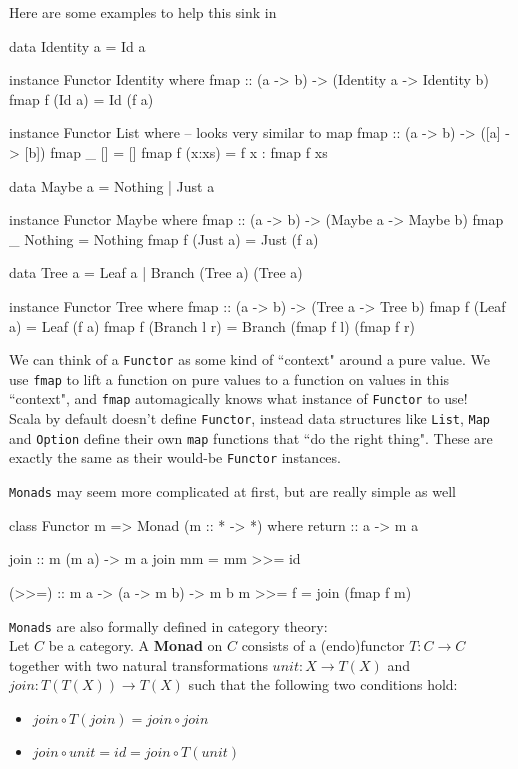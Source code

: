 \documentclass[12pt]{article}
\begin{document}
Here are some examples to help this sink in
\begin{haskell}
data Identity a = Id a

instance Functor Identity where
    fmap :: (a -> b) -> (Identity a -> Identity b)
    fmap f (Id a) = Id (f a)

instance Functor List where
    -- looks very similar to map
    fmap :: (a -> b) -> ([a] -> [b])
    fmap _ []     = []
    fmap f (x:xs) = f x : fmap f xs

data Maybe a = Nothing | Just a

instance Functor Maybe where
    fmap :: (a -> b) -> (Maybe a -> Maybe b)
    fmap _ Nothing  = Nothing
    fmap f (Just a) = Just (f a)

data Tree a = Leaf a | Branch (Tree a) (Tree a)

instance Functor Tree where
    fmap :: (a -> b) -> (Tree a -> Tree b)
    fmap f (Leaf a)     = Leaf (f a)
    fmap f (Branch l r) = Branch (fmap f l) (fmap f r)
\end{haskell}

We can think of a \texttt{Functor} as some kind of ``context" around a pure
value.  We use \texttt{fmap} to lift a function on pure values to a function on
values in this ``context", and \texttt{fmap} automagically knows what instance
of \texttt{Functor} to use! \\

Scala by default doesn't define \texttt{Functor}, instead data structures like
\texttt{List}, \texttt{Map} and \texttt{Option} define their own \texttt{map}
functions that ``do the right thing". These are exactly the same as their
would-be \texttt{Functor} instances.
\newpage

\texttt{Monads} may seem more complicated at first, but are really simple as well
\begin{haskell}
class Functor m => Monad (m :: * -> *) where
    return :: a -> m a

    join :: m (m a) -> m a
    join mm = mm >>= id

    (>>=) :: m a -> (a -> m b) -> m b
    m >>= f = join (fmap f m)
\end{haskell}

\texttt{Monads} are also formally defined in category theory:\\
Let $C$ be a category. A \textbf{Monad} on $C$ consists of a (endo)functor $T : C \rightarrow C$ together with two natural transformations $unit : X \rightarrow T(X)$ and $join : T(T(X)) \rightarrow T(X)$ such that the following two conditions hold:
\begin{itemize}
    \item{$join \circ T(join) = join \circ join$}
    \item{$join \circ unit = id = join \circ T(unit)$}
\end{itemize}
\end{document}
